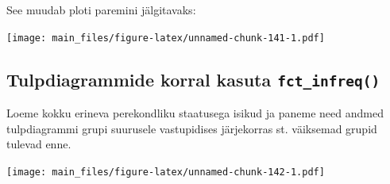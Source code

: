\documentclass[]{book}
\newenvironment{Shaded}{\begin{snugshade}}{\end{snugshade}}
\newcommand{\KeywordTok}[1]{\textcolor[rgb]{0.13,0.29,0.53}{\textbf{#1}}}
\newcommand{\DataTypeTok}[1]{\textcolor[rgb]{0.13,0.29,0.53}{#1}}
\newcommand{\StringTok}[1]{\textcolor[rgb]{0.31,0.60,0.02}{#1}}
\newcommand{\OperatorTok}[1]{\textcolor[rgb]{0.81,0.36,0.00}{\textbf{#1}}}
\newcommand{\NormalTok}[1]{#1}
\begin{document}
See muudab ploti paremini jälgitavaks:

\begin{Shaded}
\end{Shaded}

\texttt{[image: main\_files/figure-latex/unnamed-chunk-141-1.pdf]}

\subsection{\texorpdfstring{Tulpdiagrammide korral kasuta
\texttt{fct\_infreq()}}{Tulpdiagrammide korral kasuta fct\_infreq()}}\label{tulpdiagrammide-korral-kasuta-fct_infreq}

Loeme kokku erineva perekondliku staatusega isikud ja paneme need andmed
tulpdiagrammi grupi suurusele vastupidises järjekorras st. väiksemad
grupid tulevad enne.

\begin{Shaded}
\end{Shaded}

\texttt{[image: main\_files/figure-latex/unnamed-chunk-142-1.pdf]}


\end{document}
